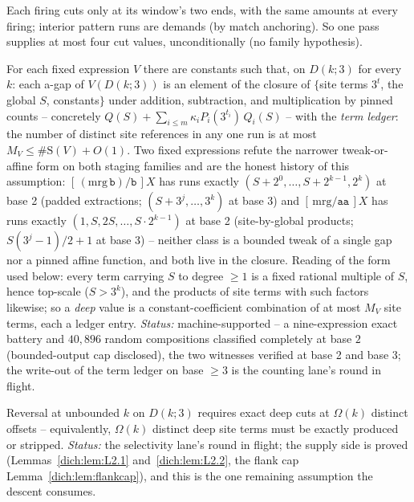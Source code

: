 \begin{lemma}
    \label{dich:lem:L2.2}
    Each firing cuts only at its window's two ends, with the same
    amounts at every firing; interior pattern runs are demands (by
    match anchoring).  So one pass supplies at most four cut values,
    unconditionally (no family hypothesis).
\end{lemma}

\begin{proposition}
    \label{dich:L1}
    For each fixed expression $V$ there are constants such that, on
    $D(k;3)$ for every $k$: each a-gap of $V(D(k;3))$ is an element of
    the closure of $\{$site terms $3^t$, the global $S$,
    constants$\}$ under addition, subtraction, and multiplication by
    pinned counts -- concretely
    $Q(S) + \sum_{i \le m} \kappa_i P_i(3^{t_i})\, Q_i(S)$ -- with the
    \emph{term ledger}: the number of distinct site references in any
    one run is at most $M_V \le \#\mathrm{S}(V) + O(1)$.
    Two fixed expressions refute the narrower tweak-or-affine form on
    both staging families and are the honest history of this
    assumption: $[\,(\mathrm{mrg}\,\mathtt b)/\mathtt b\,]X$ has runs
    exactly $(S + 2^0, \ldots, S + 2^{k-1}, 2^k)$ at base 2 (padded
    extractions; $(S + 3^j, \ldots, 3^k)$ at base 3) and
    $[\,\mathrm{mrg}/\mathtt{aa}\,]X$ has runs exactly
    $(1, S, 2S, \ldots, S\cdot 2^{k-1})$ at base 2 (site-by-global
    products; $S(3^j-1)/2 + 1$ at base 3) -- neither class is a
    bounded tweak of a single gap nor a pinned affine function, and
    both live in the closure.
    Reading of the form used below: every term carrying $S$ to degree
    $\ge 1$ is a fixed rational multiple of $S$, hence top-scale
    ($S > 3^k$), and the products of site terms with such factors
    likewise; so a \emph{deep} value is a constant-coefficient
    combination of at most $M_V$ site terms, each a ledger entry.
    \emph{Status:} machine-supported -- a nine-expression exact battery
    and $40{,}896$ random compositions classified completely at base
    $2$ (bounded-output cap disclosed), the two witnesses verified at
    base 2 and base 3; the write-out of the term ledger on base
    $\ge 3$ is the counting lane's round in flight.
\end{proposition}

\begin{proposition}
    \label{dich:L2}
    Reversal at unbounded $k$ on $D(k;3)$ requires exact deep cuts at
    $\Omega(k)$ distinct offsets -- equivalently, $\Omega(k)$ distinct
    deep site terms must be exactly produced or stripped.
    \emph{Status:} the selectivity lane's round in flight; the supply
    side is proved (Lemmas~\ref{dich:lem:L2.1}
    and~\ref{dich:lem:L2.2}, the flank cap
    Lemma~\ref{dich:lem:flankcap}), and this is the one remaining
    assumption the descent consumes.
\end{proposition}

